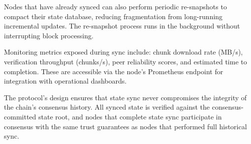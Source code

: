Nodes that have already synced can also perform periodic re-snapshots to compact their state database, reducing fragmentation from long-running incremental updates. The re-snapshot process runs in the background without interrupting block processing.

Monitoring metrics exposed during sync include: chunk download rate (MB/s), verification throughput (chunks/s), peer reliability scores, and estimated time to completion. These are accessible via the node's Prometheus endpoint for integration with operational dashboards.

The protocol's design ensures that state sync never compromises the integrity of the chain's consensus history. All synced state is verified against the consensus-committed state root, and nodes that complete state sync participate in consensus with the same trust guarantees as nodes that performed full historical sync.

